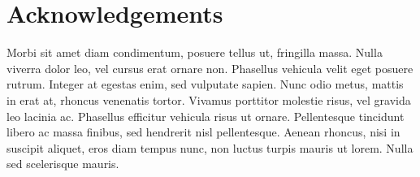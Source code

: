 \chapter*{Acknowledgements}
Morbi sit amet diam condimentum, posuere tellus ut, fringilla massa. Nulla viverra dolor leo, vel cursus erat ornare non. Phasellus vehicula velit eget posuere rutrum. Integer at egestas enim, sed vulputate sapien. Nunc odio metus, mattis in erat at, rhoncus venenatis tortor. Vivamus porttitor molestie risus, vel gravida leo lacinia ac. Phasellus efficitur vehicula risus ut ornare. Pellentesque tincidunt libero ac massa finibus, sed hendrerit nisl pellentesque. Aenean rhoncus, nisi in suscipit aliquet, eros diam tempus nunc, non luctus turpis mauris ut lorem. Nulla sed scelerisque mauris.
